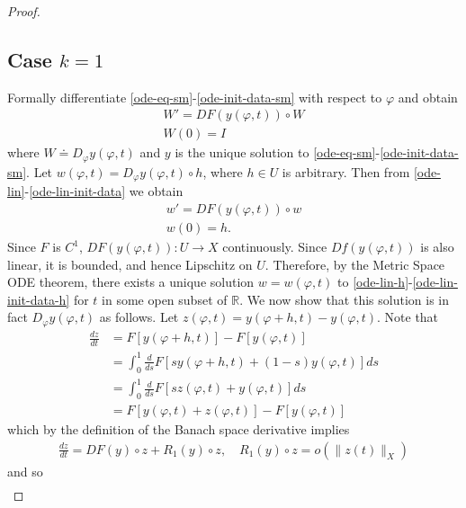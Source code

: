 \documentclass[12pt,reqno]{amsart}
\numberwithin{equation}{section}  %
\newcommand{\rr}{\mathbb{R}}
\newcommand{\vp}{\varphi}
\begin{document}
\begin{proof}
\subsection*{Case $k=1$} 
\label{ssec:case-k}
% 
%
Formally differentiate
\eqref{ode-eq-sm}-\eqref{ode-init-data-sm} with respect to $\vp$ and obtain
%
%
%
\begin{gather}
W' = DF(y(\vp,t)) \circ W
\label{ode-lin}
\\
W(0) = I
\label{ode-lin-init-data}
\end{gather}
%
%
where $W \doteq D_{\vp} y(\vp,t)$ and $y$ is the unique solution to
\eqref{ode-eq-sm}-\eqref{ode-init-data-sm}. Let $w(\vp,t) = D_{\vp}y(\vp,t) \circ h$, where $h \in U$ is
arbitrary. Then
from \eqref{ode-lin}-\eqref{ode-lin-init-data} we
obtain
%
%
\begin{gather}
w' = DF(y(\vp, t)) \circ w 
\label{ode-lin-h}
\\
w(0) = h.
\label{ode-lin-init-data-h}
\end{gather}
%
%
Since $F$ is $C^{1}$, $DF(y(\vp, t)): U \to X$ continuously. Since $Df(y(\vp,
t))$ is also linear, it is bounded, and hence Lipschitz on $U$. Therefore, by
the Metric Space ODE theorem, there exists a unique solution $w = w(\vp,t)$ to
\eqref{ode-lin-h}-\eqref{ode-lin-init-data-h} for $t$ in some open subset of
$\rr$. We now show that this solution is in fact $D_{\vp} y(\vp,t)$ as follows.
Let $z(\vp,t) = y(\vp + h, t) - y(\vp,t)$. Note that
%
%
\begin{equation}
\label{uhh}
\begin{split}
\frac{dz}{dt} 
& = F\left[ y(\vp + h, t) \right] - F\left[ y(\vp,t) \right]
\\
& = \int_{0}^{1} \frac{d}{ds} F\left[ sy(\vp+h, t) + (1-s)y(\vp,t) \right]ds
\\
& = \int_{0}^{1} \frac{d}{ds} F\left[ sz(\vp,t) + y(\vp,t) \right] ds
\\
& = F[y(\vp,t) +z(\vp, t)] - F[y(\vp, t)]
\end{split}
\end{equation}
%
%
which by the definition of the Banach space derivative implies
%
%
\begin{equation*}
\begin{split}
\frac{dz}{dt} = DF(y) \circ z + R_{1}(y) \circ z, \quad R_{1}(y) \circ z = o(\|
z(t) \|_{X})
\end{split}
\end{equation*}
%
%
and so
%
%
\begin{equation*}
\begin{split}

\end{split}
\end{equation*}
\end{proof}
\end{document}
